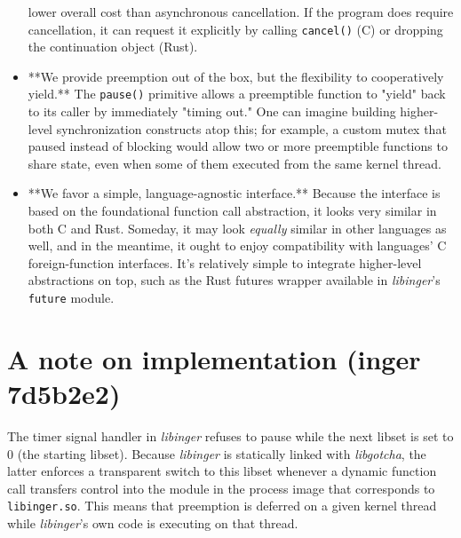 \documentclass[12pt,letterpaper,openright]{report}
\begin{document}
\begin{itemize}
	lower overall cost than asynchronous cancellation.  If the program does require cancellation, it
	can request it explicitly by calling \texttt{cancel()} (C) or dropping the continuation object (Rust).
\item **We provide preemption out of the box, but the flexibility to cooperatively yield.**  The
	\texttt{pause()} primitive allows a preemptible function to "yield" back to its caller by immediately
	"timing out."  One can imagine building higher-level synchronization constructs atop this; for
	example, a custom mutex that paused instead of blocking would allow two or more preemptible
	functions to share state, even when some of them executed from the same kernel thread.
\item **We favor a simple, language-agnostic interface.**  Because the interface is based on the
	foundational function call abstraction, it looks very similar in both C and Rust.  Someday, it
	may look \textit{equally} similar in other languages as well, and in the meantime, it ought to enjoy
	compatibility with languages' C foreign-function interfaces.  It's relatively simple to integrate
	higher-level abstractions on top, such as the Rust futures wrapper available in \textit{libinger}'s
	\texttt{future} module.
\end{itemize}


\section{A note on implementation (inger 7d5b2e2)}

The timer signal handler in \textit{libinger} refuses to pause while the next libset is set to 0 (the
starting libset).  Because \textit{libinger} is statically linked with \textit{libgotcha}, the latter enforces a
transparent switch to this libset whenever a dynamic function call transfers control into the module
in the process image that corresponds to \texttt{libinger.so}.  This means that preemption is deferred on a
given kernel thread while \textit{libinger}'s own code is executing on that thread.
\end{document}
